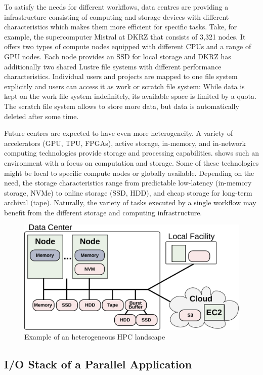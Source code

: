 \documentclass[a4paper]{article}
\newcommand{\jk}[1]{\todo[inline]{JK: #1}}
\begin{document}
To satisfy the needs for different workflows, data centres are providing a infrastructure consisting of computing and storage devices with different characteristics which makes them more efficient for specific tasks.
Take, for example, the supercomputer Mistral at DKRZ that consists of 3,321 nodes.
It offers two types of compute nodes equipped with different CPUs and a range of GPU nodes.
Each node provides an SSD for local storage and DKRZ has additionally two shared Lustre file systems with different performance characteristics.
Individual users and projects are mapped to one file system explicitly and users can access it as work or scratch file system: While data is kept on the work file system indefinitely, its available space is limited by a quota.
The scratch file system allows to store more data, but data is automatically deleted after some time.

Future centres are expected to have even more heterogeneity. A variety of accelerators (GPU, TPU, FPGAs), active storage, in-memory, and in-network computing technologies provide storage and processing capabilities.
 shows such an environment with a focus on computation and storage.
Some of these technologies might be local to specific compute nodes or globally available.
Depending on the need, the storage characteristics range from predictable low-latency (in-memory storage, NVMe) to online storage (SSD, HDD), and cheap storage for long-term archival (tape).
\jk{Mention BBs, e.g., DDN IME}
Naturally, the variety of tasks executed by a single workflow may benefit from the different storage and computing infrastructure.

\begin{figure}[H]
  \centering
  \includegraphics[width=0.6\columnwidth]{system}
  \caption{Example of an heterogeneous HPC landscape}
  \label{fig:heterogeneous}
\end{figure}


\subsection{I/O Stack of a Parallel Application}
\end{document}
